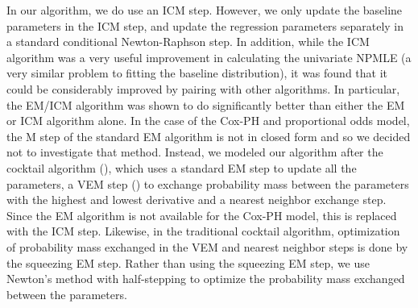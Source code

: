\documentclass[article]{jss}
\begin{document}
	In our algorithm, we do use an ICM step. However, we only update the baseline parameters in the ICM step, and update the regression parameters separately in a standard conditional Newton-Raphson step. In addition, while the ICM algorithm was a very useful improvement in calculating the univariate NPMLE (a very similar problem to fitting the baseline distribution), it was found that it could be considerably improved by pairing with other algorithms. In particular, the EM/ICM algorithm was shown to do significantly better than either the EM or ICM algorithm alone. In the case of the Cox-PH and proportional odds model, the M step of the standard EM algorithm is not in closed form and so we decided not to investigate that method. Instead, we modeled our algorithm after the cocktail algorithm (\cite{cocktail}), which uses a standard EM step to update all the parameters, a VEM step (\cite{vem}) to exchange probability mass between the parameters with the highest and lowest derivative and a nearest neighbor exchange step. Since the EM algorithm is not available for the Cox-PH model, this is replaced with the ICM step. Likewise, in the traditional cocktail algorithm, optimization of probability mass exchanged in the VEM and nearest neighbor steps is done by the squeezing EM step. Rather than using the squeezing EM step, we use Newton's method with half-stepping to optimize the probability mass exchanged between the parameters. 
\end{document}
